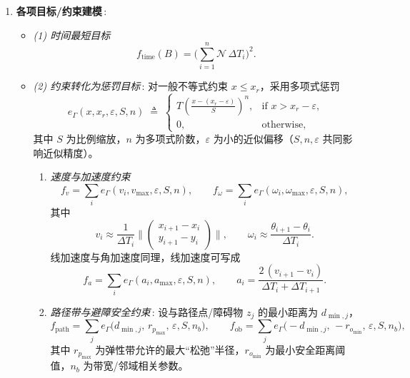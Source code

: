 \documentclass[../main.tex]{subfiles}
\begin{document}
\begin{enumerate}
\begin{itemize}
{\begin{enumerate}
  \item \textbf{各项目标/约束建模}\,:  
  \begin{itemize}
    \item \emph{(1) 时间最短目标}  
    \[
       f_{\text{time}}(B)=\Big(\sum_{i=1}^{n} \mathcal{N}\,\Delta T_i\Big)^2 .
    \]
    \item \emph{(2) 约束转化为惩罚目标}\,: 对一般不等式约束 $x\le x_r$，采用多项式惩罚
    \[
      e_{\Gamma}(x,x_r,\varepsilon,S,n)\; \triangleq\;
      \begin{cases}
        \displaystyle T\!\left(\frac{x-(x_r-\varepsilon)}{S}\right)^{\!n}, & \text{if } x>x_r-\varepsilon,\\[6pt]
        0, & \text{otherwise},
      \end{cases}
    \]
    其中 $S$ 为比例缩放，$n$ 为多项式阶数，$\varepsilon$ 为小的近似偏移（$S,n,\varepsilon$ 共同影响近似精度）。
    \begin{enumerate}
    \item \emph{速度与加速度约束}
    \[
      f_v=\sum_i e_{\Gamma}(v_i,v_{\max},\varepsilon,S,n),\qquad
      f_\omega=\sum_i e_{\Gamma}(\omega_i,\omega_{\max},\varepsilon,S,n),
    \]
    其中
    \[
      v_i \approx \frac{1}{\Delta T_i}\Big\|\begin{pmatrix}x_{i+1}-x_i\\ y_{i+1}-y_i\end{pmatrix}\Big\|,\qquad
      \omega_i \approx \frac{\theta_{i+1}-\theta_i}{\Delta T_i}.
    \]
    线加速度与角加速度同理，线加速度可写成
    \[
      f_a=\sum_i e_{\Gamma}(a_i,a_{\max},\varepsilon,S,n),\qquad
      a_i=\frac{2\,(v_{i+1}-v_i)}{\Delta T_i+\Delta T_{i+1}}.
    \]

    \item \emph{路径带与避障安全约束}\,: 设与路径点/障碍物 $z_j$ 的最小距离为 $d_{\min,j}$，
    \[
      f_{\text{path}}=\sum_j e_{\Gamma}\!\big(d_{\min,j},\,r_{p_{\max}},\,\varepsilon,S,n_b\big),\qquad
      f_{\text{ob}}=\sum_j e_{\Gamma}\!\big(-d_{\min,j},\,-r_{o_{\min}},\,\varepsilon,S,n_b\big),
    \]
    其中 $r_{p_{\max}}$ 为弹性带允许的最大“松弛”半径，$r_{o_{\min}}$ 为最小安全距离阈值，$n_b$ 为带宽/邻域相关参数。


\end{enumerate}
\end{itemize}
\end{enumerate}}
\end{itemize}
\end{enumerate}
\end{document}
